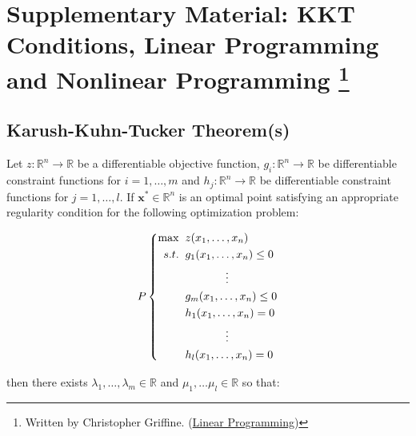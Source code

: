 \section[Supplementary Material: KKT Conditions, Linear Programming and Nonlinear Programming]{Supplementary Material: KKT Conditions, Linear Programming and Nonlinear Programming \footnote{Written by Christopher Griffine. (\href{http://www.personal.psu.edu/cxg286/LinearProgramming.html}{Linear Programming})}}



\subsection{Karush-Kuhn-Tucker Theorem(s)}

\begin{theorem} Let $z : \mathbb{R}^n \rightarrow \mathbb{R}$ be a differentiable objective function, $g_i:\mathbb{R}^n \rightarrow \mathbb{R}$ be differentiable constraint functions for $i = 1,\dots,m$ and $h_j:\mathbb{R}^n \rightarrow \mathbb{R}$ be differentiable constraint functions for $j=1,\dots,l$. If $\mathbf{x}^* \in \mathbb{R}^n$ is an optimal point satisfying an appropriate regularity condition for the following optimization problem:

\begin{displaymath}
P\left\{
\begin{aligned}
\max\;\;& z(x_1,\dots,x_n)\\
s.t.\;\;& g_1(x_1,\dots,x_n) \leq 0\\
& \hspace*{0.5in}\vdots\\
& g_m(x_1,\dots,x_n) \leq 0\\
& h_1(x_1,\dots,x_n) = 0\\
&\hspace*{0.5in}\vdots\\
&h_l(x_1,\dots,x_n) = 0
\end{aligned}
\right.
\end{displaymath}

then there exists $\lambda_1,\dots,\lambda_m \in \mathbb{R}$ and $\mu_1,\dots\mu_l \in \mathbb{R}$ so that:


\end{theorem}
